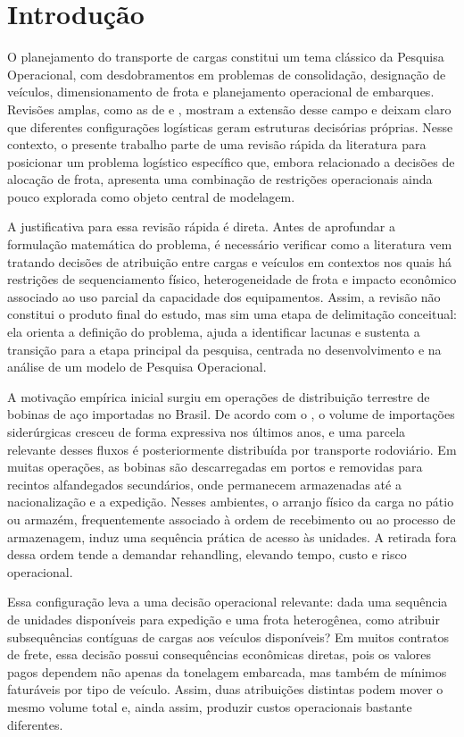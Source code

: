\section{Introdução}

O planejamento do transporte de cargas constitui um tema clássico da Pesquisa
Operacional, com desdobramentos em problemas de consolidação, designação de
veículos, dimensionamento de frota e planejamento operacional de embarques.
Revisões amplas, como as de \textcite{crainic1997planning} e
\textcite{steadieseifi2014multimodal}, mostram a extensão desse campo e deixam
claro que diferentes configurações logísticas geram estruturas decisórias
próprias. Nesse contexto, o presente trabalho parte de uma revisão rápida da
literatura para posicionar um problema logístico específico que, embora
relacionado a decisões de alocação de frota, apresenta uma combinação de
restrições operacionais ainda pouco explorada como objeto central de modelagem.

A justificativa para essa revisão rápida é direta. Antes de aprofundar a
formulação matemática do problema, é necessário verificar como a literatura vem
tratando decisões de atribuição entre cargas e veículos em contextos nos quais
há restrições de sequenciamento físico, heterogeneidade de frota e impacto
econômico associado ao uso parcial da capacidade dos equipamentos. Assim, a
revisão não constitui o produto final do estudo, mas sim uma etapa de
delimitação conceitual: ela orienta a definição do problema, ajuda a identificar
lacunas e sustenta a transição para a etapa principal da pesquisa, centrada no
desenvolvimento e na análise de um modelo de Pesquisa Operacional.

A motivação empírica inicial surgiu em operações de distribuição terrestre de
bobinas de aço importadas no Brasil. De acordo com o \textcite{acobrasil2025},
o volume de importações siderúrgicas cresceu de forma expressiva nos últimos
anos, e uma parcela relevante desses fluxos é posteriormente distribuída por
transporte rodoviário. Em muitas operações, as bobinas são descarregadas em
portos e removidas para recintos alfandegados secundários, onde permanecem
armazenadas até a nacionalização e a expedição. Nesses ambientes, o arranjo
físico da carga no pátio ou armazém, frequentemente associado à ordem de
recebimento ou ao processo de armazenagem, induz uma sequência prática de acesso
às unidades. A retirada fora dessa ordem tende a demandar rehandling, elevando
tempo, custo e risco operacional.

Essa configuração leva a uma decisão operacional relevante: dada uma sequência
de unidades disponíveis para expedição e uma frota heterogênea, como atribuir
subsequências contíguas de cargas aos veículos disponíveis? Em muitos contratos
de frete, essa decisão possui consequências econômicas diretas, pois os valores
pagos dependem não apenas da tonelagem embarcada, mas também de mínimos
faturáveis por tipo de veículo. Assim, duas atribuições distintas podem mover o
mesmo volume total e, ainda assim, produzir custos operacionais bastante
diferentes.

